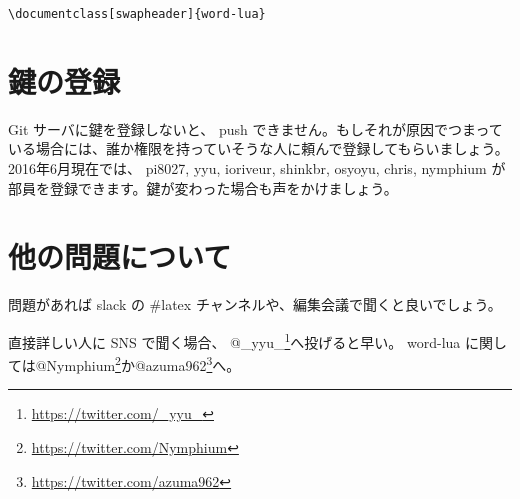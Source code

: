 \begin{lstlisting}[mathescape]
\documentclass[swapheader]{word-lua}
\end{lstlisting}

\section{鍵の登録}

Git サーバに鍵を登録しないと、 push できません。もしそれが原因でつまっている場合には、誰か権限を持っていそうな人に頼んで登録してもらいましょう。2016年6月現在では、
pi8027, yyu, ioriveur, shinkbr, osyoyu, chris, nymphium が部員を登録できます。鍵が変わった場合も声をかけましょう。

\section{他の問題について}

問題があれば slack の \#latex チャンネルや、編集会議で聞くと良いでしょう。

直接詳しい人に SNS で聞く場合、 @\_yyu\_\footnote{\url{https://twitter.com/_yyu_}}へ投げると早い。
word-lua に関しては@Nymphium\footnote{\url{https://twitter.com/Nymphium}}か@azuma962\footnote{\url{https://twitter.com/azuma962}}へ。



